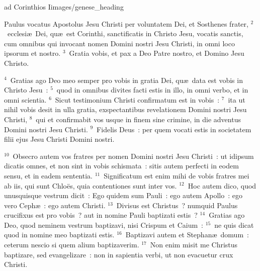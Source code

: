 {ad Corinthios I}{images/genese_heading}


\lettrine[lines=6,image=true,loversize=0.05,lraise=-0.03]{P}{}aulus vocatus Apostolus Jesu Christi per voluntatem Dei, et Sosthenes frater,
${}^{2}$~ecclesi\ae\ Dei, qu\ae\ est Corinthi, sanctificatis in Christo Jesu, vocatis sanctis, cum omnibus qui invocant nomen Domini nostri Jesu Christi, in omni loco ipsorum et nostro.
${}^{3}$~Gratia vobis, et pax a Deo Patre nostro, et Domino Jesu Christo.


${}^{4}$~Gratias ago Deo meo semper pro vobis in gratia Dei, qu\ae\ data est vobis in Christo Jesu~:
${}^{5}$~quod in omnibus divites facti estis in illo, in omni verbo, et in omni scientia.
${}^{6}$~Sicut testimonium Christi confirmatum est in vobis~:
${}^{7}$~ita ut nihil vobis desit in ulla gratia, exspectantibus revelationem Domini nostri Jesu Christi,
${}^{8}$~qui et confirmabit vos usque in finem sine crimine, in die adventus Domini nostri Jesu Christi.
${}^{9}$~Fidelis Deus~: per quem vocati estis in societatem filii ejus Jesu Christi Domini nostri.


${}^{10}$~Obsecro autem vos fratres per nomen Domini nostri Jesu Christi~: ut idipsum dicatis omnes, et non sint in vobis schismata~: sitis autem perfecti in eodem sensu, et in eadem sententia.
${}^{11}$~Significatum est enim mihi de vobis fratres mei ab iis, qui sunt Chlo\"es, quia contentiones sunt inter vos.
${}^{12}$~Hoc autem dico, quod unusquisque vestrum dicit~: Ego quidem sum Pauli~: ego autem Apollo~: ego vero Ceph\ae~: ego autem Christi.
${}^{13}$~Divisus est Christus~? numquid Paulus crucifixus est pro vobis~? aut in nomine Pauli baptizati estis~?
${}^{14}$~Gratias ago Deo, quod neminem vestrum baptizavi, nisi Crispum et Caium~:
${}^{15}$~ne quis dicat quod in nomine meo baptizati estis.
${}^{16}$~Baptizavi autem et Stephan\ae\ domum~: ceterum nescio si quem alium baptizaverim.
${}^{17}$~Non enim misit me Christus baptizare, sed evangelizare~: non in sapientia verbi, ut non evacuetur crux Christi.


